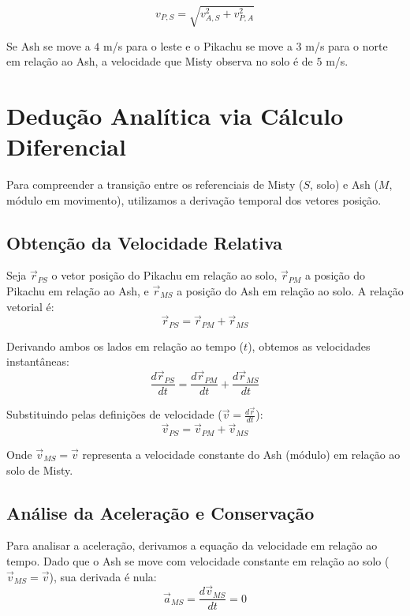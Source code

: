 \documentclass[11pt,a4paper]{article}
\begin{document}
\begin{equation}
v_{P,S} = \sqrt{v_{A,S}^2 + v_{P,A}^2}
\end{equation}

Se Ash se move a $4$ m/s para o leste e o Pikachu se move a $3$ m/s para o norte em relação ao Ash, a velocidade que Misty observa no solo é de $5$ m/s.

\section{Dedução Analítica via Cálculo Diferencial}

Para compreender a transição entre os referenciais de Misty ($S$, solo) e Ash ($M$, módulo em movimento), utilizamos a derivação temporal dos vetores posição.

\subsection{Obtenção da Velocidade Relativa}
Seja $\vec{r}_{PS}$ o vetor posição do Pikachu em relação ao solo, $\vec{r}_{PM}$ a posição do Pikachu em relação ao Ash, e $\vec{r}_{MS}$ a posição do Ash em relação ao solo. A relação vetorial é:
\begin{equation}
\vec{r}_{PS} = \vec{r}_{PM} + \vec{r}_{MS}
\end{equation}

Derivando ambos os lados em relação ao tempo ($t$), obtemos as velocidades instantâneas:
\begin{equation}
\frac{d\vec{r}_{PS}}{dt} = \frac{d\vec{r}_{PM}}{dt} + \frac{d\vec{r}_{MS}}{dt}
\end{equation}

Substituindo pelas definições de velocidade ($\vec{v} = \frac{d\vec{r}}{dt}$):
\begin{equation}
\vec{v}_{PS} = \vec{v}_{PM} + \vec{v}_{MS}
\end{equation}

Onde $\vec{v}_{MS} = \vec{v}$ representa a velocidade constante do Ash (módulo) em relação ao solo de Misty.

\subsection{Análise da Aceleração e Conservação}
Para analisar a aceleração, derivamos a equação da velocidade em relação ao tempo. Dado que o Ash se move com velocidade constante em relação ao solo ($\vec{v}_{MS} = \vec{v}$), sua derivada é nula:
\begin{equation}
\vec{a}_{MS} = \frac{d\vec{v}_{MS}}{dt} = 0
\end{equation}
\end{document}
